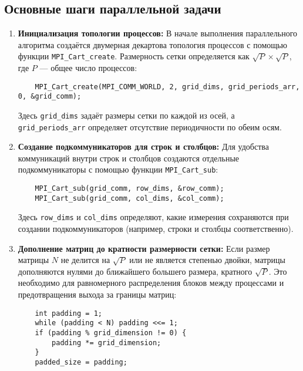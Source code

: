 \documentclass{report}
\begin{document}
\subsection*{Основные шаги параллельной задачи}

\begin{enumerate}
    \item \textbf{Инициализация топологии процессов:}  
    В начале выполнения параллельного алгоритма создаётся двумерная декартова топология процессов с помощью функции \texttt{MPI\_Cart\_create}. Размерность сетки определяется как $\sqrt{P} \times \sqrt{P}$, где $P$ — общее число процессов:
    \begin{lstlisting}
    MPI_Cart_create(MPI_COMM_WORLD, 2, grid_dims, grid_periods_arr, 0, &grid_comm);
    \end{lstlisting}
    Здесь \texttt{grid\_dims} задаёт размеры сетки по каждой из осей, а \texttt{grid\_periods\_arr} определяет отсутствие периодичности по обеим осям.

    \item \textbf{Создание подкоммуникаторов для строк и столбцов:}  
    Для удобства коммуникаций внутри строк и столбцов создаются отдельные подкоммуникаторы с помощью функции \texttt{MPI\_Cart\_sub}:
    \begin{lstlisting}
    MPI_Cart_sub(grid_comm, row_dims, &row_comm);
    MPI_Cart_sub(grid_comm, col_dims, &col_comm);
    \end{lstlisting}
    Здесь \texttt{row\_dims} и \texttt{col\_dims} определяют, какие измерения сохраняются при создании подкоммуникаторов (например, строки и столбцы соответственно).

    \item \textbf{Дополнение матриц до кратности размерности сетки:}  
    Если размер матрицы $N$ не делится на $\sqrt{P}$ или не является степенью двойки, матрицы дополняются нулями до ближайшего большего размера, кратного $\sqrt{P}$. Это необходимо для равномерного распределения блоков между процессами и предотвращения выхода за границы матриц:
    \begin{lstlisting}
    int padding = 1;
    while (padding < N) padding <<= 1;
    if (padding % grid_dimension != 0) {
        padding *= grid_dimension;
    }
    padded_size = padding;
    \end{lstlisting}


\end{enumerate}
\end{document}
